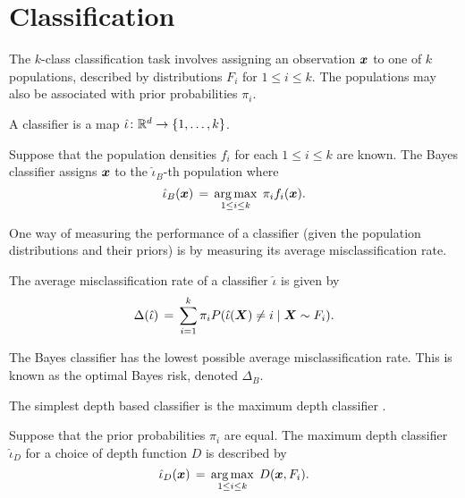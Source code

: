 \section{Classification}
\label{ch:multivariate_classification}

The $k$-class classification task involves assigning an observation $\bm{x}$ to
one of $k$ populations, described by distributions $F_i$ for $1 \leq i \leq
k$.
The populations may also be associated with prior probabilities $\pi_i$.

\begin{definition}[Classifier]
    A classifier is a map $\hat{\iota}\colon \mathbb{R}^d \to \{1, \dots, k\}$.
\end{definition}

\begin{example}
    Suppose that the population densities $f_i$ for each $1 \leq i \leq k$ are
    known.
    The Bayes classifier assigns $\bm{x}$ to the $\hat{\iota}_B$-th population
    where
    \begin{equation}
        \hat{\iota}_B(\bm{x}) \,=\, \operatorname*{arg\,max}_{1 \leq i \leq k}\; \pi_i f_i(\bm{x}).
    \end{equation}
\end{example}

One way of measuring the performance of a classifier (given the population
distributions and their priors) is by measuring its average misclassification
rate.

\begin{definition}
    The average misclassification rate of a classifier $\hat{\iota}$ is given
    by
    \begin{equation}
        \Delta(\hat{\iota}) \,=\, \sum_{i = 1}^k \pi_i P(\hat{\iota}(\bm{X}) \neq i \mid \bm{X} \sim F_i).
    \end{equation}
\end{definition}

\begin{proposition}
    The Bayes classifier has the lowest possible average misclassification
    rate. This is known as the optimal Bayes risk, denoted $\Delta_B$.
\end{proposition}

The simplest depth based classifier is the maximum depth classifier
\parencite{ghosh-chaudhuri-2005}.

\begin{example}
    Suppose that the prior probabilities $\pi_i$ are equal.
    The maximum depth classifier $\hat{\iota}_D$ for a choice of depth
    function $D$ is described by
    \begin{equation}
        \hat{\iota}_D(\bm{x}) \,=\, \operatorname*{arg\,max}_{1 \leq i \leq k}\; D(\bm{x}, F_i).
    \end{equation}
\end{example}

